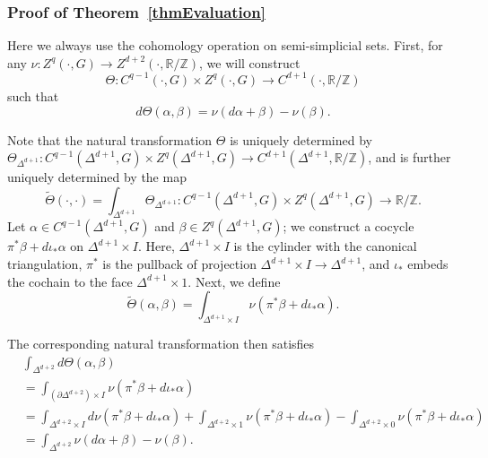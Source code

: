 \documentclass[reprint, amsmath, amssymb, showpacs, floatfix, longbibliography, aps, twocolumn, superscriptaddress, nofootinbib]{revtex4-2}
\newcommand{\ZZ}{{\mathbb Z}}
\newcommand{\RR}{{\mathbb R}}
\theoremstyle{definition}
\begin{document}
\subsubsection*{Proof of Theorem~\ref{thmEvaluation}}

Here we always use the cohomology operation on semi-simplicial sets. First, for any $\nu: Z^q(\cdot,G)\rightarrow Z^{d+2}(\cdot,\RR/\ZZ)$, we will construct 
\begin{equation}
	\Theta: C^{q-1}(\cdot,G)\times Z^q(\cdot,G)\rightarrow C^{d+1}(\cdot,\RR/\ZZ)
\end{equation}
 such that
\begin{equation}\label{eqB58}
	d\Theta(\alpha,\beta)=\nu(d\alpha+\beta)-\nu(\beta).
\end{equation}

Note that the natural transformation $\Theta$ is uniquely determined by $\Theta_{\Delta^{d+1}}: C^{q-1}(\Delta^{d+1},G)\times Z^q(\Delta^{d+1},G)\rightarrow C^{d+1}(\Delta^{d+1},\RR/\ZZ)$, and is further uniquely determined by the map 
\begin{equation}
	\tilde{\Theta}(\cdot,\cdot)=\int_{\Delta^{d+1}}\Theta_{\Delta^{d+1}}:C^{q-1}(\Delta^{d+1},G)\times Z^q(\Delta^{d+1},G)\rightarrow \RR/\ZZ.
\end{equation}
 Let $\alpha\in C^{q-1}(\Delta^{d+1},G)$ and $\beta\in Z^q(\Delta^{d+1},G)$; we construct a cocycle $\pi^*\beta+d\iota_*\alpha$ on $\Delta^{d+1}\times I$. Here, $\Delta^{d+1}\times I$ is the cylinder with the canonical triangulation, $\pi^*$ is the pullback of projection $\Delta^{d+1}\times I\rightarrow \Delta^{d+1}$, and $\iota_*$ embeds the cochain to the face $\Delta^{d+1}\times 1$. Next, we define
\begin{equation}
	\tilde{\Theta}(\alpha,\beta)=\int_{\Delta^{d+1}\times I}\nu(\pi^*\beta+d\iota_*\alpha).
\end{equation}

The corresponding natural transformation then satisfies
\begin{equation}
	\begin{aligned}
		&\int_{\Delta^{d+2}}d\Theta(\alpha,\beta)\\&=\int_{(\partial\Delta^{d+2})\times I}\nu(\pi^*\beta+d\iota_*\alpha)\\&=\int_{\Delta^{d+2}\times I}d\nu (\pi^*\beta+d\iota_*\alpha)+\int_{\Delta^{d+2}\times 1}\nu(\pi^*\beta+d\iota_*\alpha)-\int_{\Delta^{d+2}\times 0}\nu(\pi^*\beta+d\iota_*\alpha)\\&=\int_{\Delta^{d+2}}\nu(d\alpha+\beta)-\nu(\beta).
	\end{aligned}
\end{equation}
\end{document}
